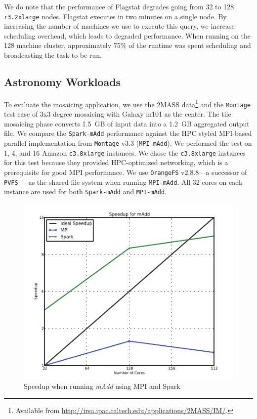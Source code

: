 \documentclass{sig-alternate}
\begin{document}
We do note that the performance of Flagstat degrades going from 32 to 128 \texttt{r3.2xlarge} nodes.
Flagstat executes in two minutes on a single node. By increasing the number of machines
we use to execute this query, we increase scheduling overhead, which leads to degraded
performance. When running on the 128 machine cluster, approximately 75\% of the runtime was spent
scheduling and broadcasting the task to be run.

\subsection{Astronomy Workloads}
\label{sec:astro-workloads}

To evaluate the mosaicing application, we use the 2MASS data\footnote{Available from
\url{http://irsa.ipac.caltech.edu/applications/2MASS/IM/}.} and the \texttt{Montage} test case of 3x3 degree
mosaicing with Galaxy m101 as the center. The tile mosaicing phase converts 1.5~GB of input data into a
1.2~GB aggregated output file. We compare the \texttt{Spark-mAdd} performance against the HPC styled
MPI-based parallel implementation from \texttt{Montage} v3.3 (\texttt{MPI-mAdd}). We
performed the test on 1, 4, and 16 Amazon \texttt{c3.8xlarge} instances. We chose the \texttt{c3.8xlarge} instances
for this test because they provided HPC-optimized networking, which is a prerequisite for good MPI performance.
We use \texttt{OrangeFS} v2.8.8---a successor of \texttt{PVFS}~\cite{PVFS}---as the shared file system when running
\texttt{MPI-mAdd}. All 32 cores on each instance are used for both \texttt{Spark-mAdd} and \texttt{MPI-mAdd}.

\begin{figure}[h]
\begin{center}
\includegraphics{graphs/speedup_madd.pdf}
\end{center}
\caption{Speedup when running \textit{mAdd} using MPI and Spark}
\label{fig:madd-speedup}
\end{figure}
\end{document}
